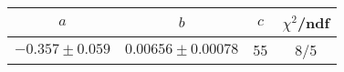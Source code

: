 \begin{tabular}{c|c|c|c}
$a$ & $b$ & $c$ & $\chi^2$/ndf \\
\hline
$-0.357\pm0.059$ & $0.00656\pm0.00078$ & 55 & 8/5
\end{tabular}
